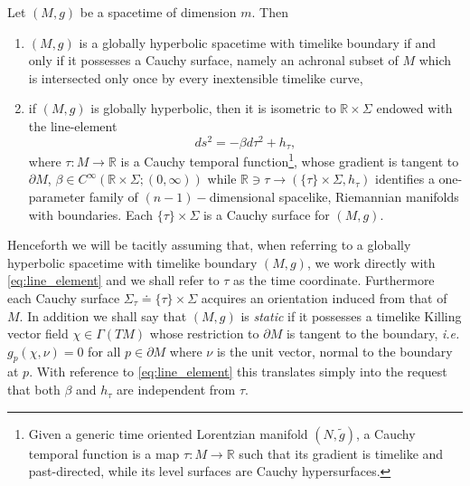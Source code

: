 \begin{theorem}
	Let $(M,g)$ be a spacetime of dimension $m$. Then 
	\begin{enumerate}
		\item $(M,g)$ is a globally hyperbolic spacetime with timelike boundary if and only if it possesses a Cauchy surface, namely an achronal subset of $M$ which is intersected only once by every inextensible timelike curve,
		\item if $(M,g)$ is globally hyperbolic, then it is isometric to $\mathbb{R}\times\Sigma$ endowed with the line-element
		\begin{equation}\label{eq:line_element}
		ds^2=-\beta d\tau^2+h_\tau,
		\end{equation}
		where $\tau:M\to\mathbb{R}$ is a Cauchy temporal function\footnote{Given a generic time oriented Lorentzian manifold $(N,\tilde{g})$, a Cauchy temporal function is a map $\tau:M\to\mathbb{R}$ such that its gradient is timelike and past-directed, while its level surfaces are Cauchy hypersurfaces.}, whose gradient is tangent to $\partial M$, $\beta\in C^\infty(\mathbb{R}\times\Sigma;(0,\infty))$ while $\mathbb{R}\ni\tau\to (\{\tau\}\times\Sigma,h_\tau)$ identifies a one-parameter family of $(n-1)-$dimensional spacelike, Riemannian manifolds with boundaries. Each $\{\tau\}\times\Sigma$ is a Cauchy surface for $(M,g)$.
	\end{enumerate}
\end{theorem}


Henceforth we will be tacitly assuming that, when referring to a globally hyperbolic spacetime with timelike boundary $(M,g)$, we work directly with \eqref{eq:line_element} and we shall refer to $\tau$ as the time coordinate. Furthermore each Cauchy surface $\Sigma_\tau\doteq\{\tau\}\times\Sigma$ acquires an orientation induced from that of $M$. In addition we shall say that $(M,g)$ is {\em static} if it possesses a timelike Killing vector field $\chi\in\Gamma(TM)$ whose restriction to $\partial M$ is tangent to the boundary, {\it i.e.} $g_p(\chi,\nu)=0$ for all $p\in\partial M$ where $\nu$ is the unit vector, normal to the boundary at $p$. With reference to \eqref{eq:line_element} this translates simply into the request that both $\beta$ and $h_\tau$ are independent from $\tau$.

